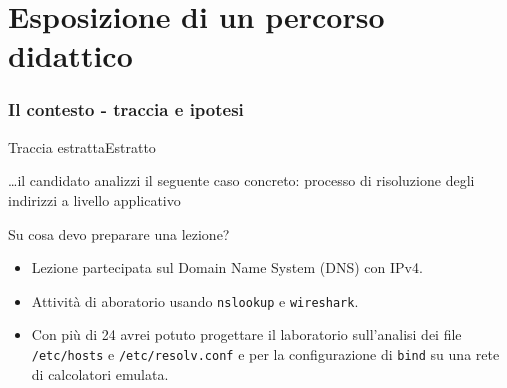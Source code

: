 \documentclass[italian]{beamer}
\begin{document}
\part[Percorso didattico]{Esposizione di un percorso didattico}
\frame{\partpage}

\section[Contesto]{Il contesto - traccia e ipotesi}

\begin{frame}{Traccia estratta}{Estratto}

	\begin{block}{\ldots{}il candidato analizzi il seguente caso concreto:}
		\large{processo di risoluzione degli indirizzi a livello applicativo}
	\end{block}
	
	\begin{block}{Su cosa devo preparare una lezione?}
		\begin{itemize}
			\item Lezione partecipata sul \alert<2>{Domain Name System (DNS)} con IPv4.
			\item Attivit\`a di aboratorio usando \texttt{nslookup} e \texttt{wireshark}.
			\item Con pi\`u di 24 avrei potuto progettare il laboratorio sull'analisi dei file \texttt{/etc/hosts} e \texttt{/etc/resolv.conf} e per la configurazione di \texttt{bind} su una rete di calcolatori emulata.
		\end{itemize}
	\end{block}

\end{frame}
\end{document}
